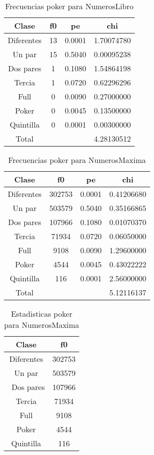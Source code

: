 \documentclass[a4paper]{article}
\begin{document}
\begin{table}
\centering
\begin{tabular}{cccc}
\\\hline
Clase&f0&pe&chi\\\hline
Diferentes&13&0.0001&1.70074780\\
Un par&15&0.5040&0.00095238\\
Dos pares&1&0.1080&1.54864198\\
Tercia&1&0.0720&0.62296296\\
Full&0&0.0090&0.27000000\\
Poker&0&0.0045&0.13500000\\
Quintilla&0&0.0001&0.00300000\\\hline
Total & & &4.28130512\\\hline
\end{tabular}
\caption{\label{tab:frecpokerNumerosLibro}Frecuencias poker para NumerosLibro}
\end{table}

\begin{table}
\centering
\begin{tabular}{cccc}
\\\hline
Clase&f0&pe&chi\\\hline
Diferentes&302753&0.0001&0.41206680\\
Un par&503579&0.5040&0.35166865\\
Dos pares&107966&0.1080&0.01070370\\
Tercia&71934&0.0720&0.06050000\\
Full&9108&0.0090&1.29600000\\
Poker&4544&0.0045&0.43022222\\
Quintilla&116&0.0001&2.56000000\\\hline
Total & & &5.12116137\\\hline
\end{tabular}
\caption{\label{tab:frecpokerNumerosMaxima}Frecuencias poker para NumerosMaxima}
\end{table}

\begin{table}
\centering
\begin{tabular}{cc}
\\\hline
Clase&f0\\\hline
Diferentes&302753\\
Un par&503579\\\
Dos pares&107966\\
Tercia&71934\\
Full&9108\\
Poker&4544\\
Quintilla&116\\\hline
\end{tabular}
\caption{\label{tab:estadistpokerNumerosMaxima}Estadisticas poker para NumerosMaxima}
\end{table}
\end{document}
